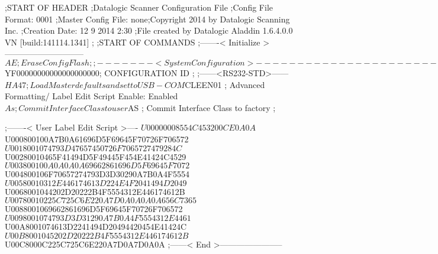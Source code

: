 ;START OF HEADER
;Datalogic Scanner Configuration File
;Config File Format: 0001
;Master Config File: none;Copyright 2014 by Datalogic Scanning Inc.
;Creation Date: 12 9 2014 2:30
;File created by Datalogic Aladdin 1.6.4.0.0 VN [build:141114.1341]
;
;START OF COMMANDS
;-------< Initialize >-----------------------------
$AE                 ; Erase Config Flash
;
;-------< System Configuration >-------------------------------
$YF00000000000000000000; CONFIGURATION ID
;
;------<RS232-STD>------
$HA47               ; Load Master defaults and set to USB-COM
$CLEEN01            ; Advanced Formatting/ Label Edit Script Enable: Enabled
$As                 ; Commit Interface Class to user
$AS                 ; Commit Interface Class to factory
;

;-------< User Label Edit Script >----
$U00000008554C453200CE0A0A
$U000800100A7B0A61696D5F69645F70726F706572
$U0018001074793D47657450726F7065727479284C
$U00280010465F41494D5F49445F454E41424C4529
$U003800100A0A0A0A69662861696D5F69645F7072
$U004800106F70657274793D3D30290A7B0A4F5554
$U00580010312E446174613D224E4F2041494D2049
$U0068001044202D20222B4F5554312E446174612B
$U00780010225C725C6E220A7D0A0A0A0A656C7365
$U0088001069662861696D5F69645F70726F706572
$U0098001074793D3D31290A7B0A4F5554312E4461
$U00A8001074613D2241494D20494420454E41424C
$U00B8001045202D20222B4F5554312E446174612B
$U00C8000C225C725C6E220A7D0A7D0A0A
;------< End >-----------------------
